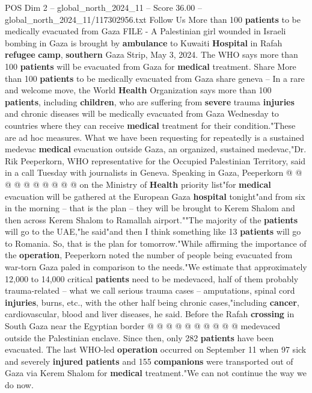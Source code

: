 \begin{textsample}{POS Dim 2 – global\_north\_2024\_11 – Score 36.00 – global\_north\_2024\_11/117302956.txt}  \label{ex:f2_pos_351}
Follow Us More than 100 \textbf{patients} to be medically evacuated from Gaza FILE - A Palestinian girl wounded in Israeli bombing in Gaza is brought by \textbf{ambulance} to Kuwaiti \textbf{Hospital} in Rafah \textbf{refugee} \textbf{camp}, \textbf{southern} Gaza Strip, May 3, 2024.
The WHO says more than 100 \textbf{patients} will be evacuated from Gaza for \textbf{medical} treatment.
Share More than 100 \textbf{patients} to be medically evacuated from Gaza share geneva -- In a rare and welcome move, the World \textbf{Health} Organization says more than 100 \textbf{patients}, including \textbf{children}, who are suffering from \textbf{severe} trauma \textbf{injuries} and chronic diseases will be medically evacuated from Gaza Wednesday to countries where they can receive \textbf{medical} treatment for their condition."These are ad hoc measures.
What we have been requesting for repeatedly is a sustained medevac \textbf{medical} evacuation outside Gaza, an organized, sustained medevac,"Dr.
Rik Peeperkorn, WHO representative for the Occupied Palestinian Territory, said in a call Tuesday with journalists in Geneva.
Speaking in Gaza, Peeperkorn @ @ @ @ @ @ @ @ @ @ on the Ministry of \textbf{Health} priority list"for \textbf{medical} evacuation will be gathered at the European Gaza \textbf{hospital} tonight"and from six in the morning -- that is the plan -- they will be brought to Kerem Shalom and then across Kerem Shalom to Ramallah airport.""The majority of the \textbf{patients} will go to the UAE,"he said"and then I think something like 13 \textbf{patients} will go to Romania.
So, that is the plan for tomorrow."While affirming the importance of the \textbf{operation}, Peeperkorn noted the number of people being evacuated from war-torn Gaza paled in comparison to the needs."We estimate that approximately 12,000 to 14,000 critical \textbf{patients} need to be medevaced, half of them probably trauma-related -- what we call serious trauma cases -- amputations, spinal cord \textbf{injuries}, burns, etc., with the other half being chronic cases,"including \textbf{cancer}, cardiovascular, blood and liver diseases, he said.
Before the Rafah \textbf{crossing} in South Gaza near the Egyptian border @ @ @ @ @ @ @ @ @ @ medevaced outside the Palestinian enclave.
Since then, only 282 \textbf{patients} have been evacuated.
The last WHO-led \textbf{operation} occurred on September 11 when 97 sick and severely \textbf{injured} \textbf{patients} and 155 \textbf{companions} were transported out of Gaza via Kerem Shalom for \textbf{medical} treatment."We can not continue the way we do now.

\end{textsample}
